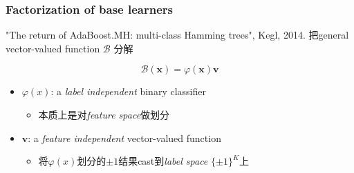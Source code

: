 \documentclass{beamer}
\begin{document}
\begin{frame}
\frametitle{Factorization of base learners}

{\color{purple} "The return of AdaBoost.MH: multi-class Hamming trees", Kegl, 2014.}
把general vector-valued function $\mathcal{B}$ 分解
\begin{block}{}
$$\mathcal{B}(\mathbf{x}) = \varphi(\mathbf{x}) \mathbf{v}$$
\end{block}
\begin{itemize}
\item $\varphi(x)$: a \textit{label independent} binary classifier 
  \begin{itemize}
    \item 本质上是对\textit{feature space}做划分
  \end{itemize}
\item $\mathbf{v}$: a \textit{feature independent} vector-valued function
  \begin{itemize}
    \item 将$\varphi(x)$划分的${\pm 1}$结果cast到\textit{label space} $\{\pm 1\}^K$上
  \end{itemize}
\end{itemize}
\end{frame}
\end{document}
